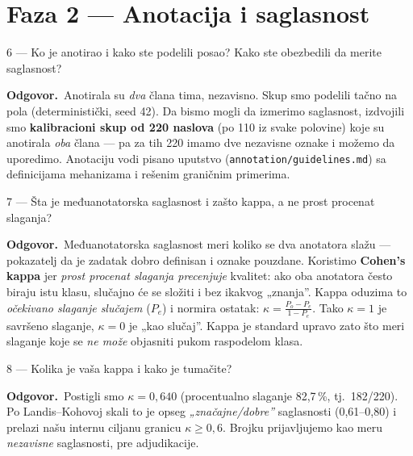 \documentclass[11pt,a4paper]{article}
\newcommand{\kod}[1]{\texttt{#1}}
\newcommand{\odg}{\smallskip\noindent\textbf{Odgovor.}\ }
\begin{document}
\section{Faza 2 --- Anotacija i saglasnost}

\begin{pitanje}{6 --- Ko je anotirao i kako ste podelili posao?}
Kako ste obezbedili da merite saglasnost?
\end{pitanje}
\odg Anotirala su \emph{dva} člana tima, nezavisno. Skup smo podelili tačno na pola
(deterministički, seed 42). Da bismo mogli da izmerimo saglasnost, izdvojili smo
\textbf{kalibracioni skup od 220 naslova} (po 110 iz svake polovine) koje su anotirala
\emph{oba} člana --- pa za tih 220 imamo dve nezavisne oznake i možemo da uporedimo.
Anotaciju vodi pisano uputstvo (\kod{annotation/guidelines.md}) sa definicijama
mehanizama i rešenim graničnim primerima.

\begin{pitanje}{7 --- Šta je međuanotatorska saglasnost i zašto kappa, a ne prost procenat slaganja?}
\end{pitanje}
\odg Međuanotatorska saglasnost meri koliko se dva anotatora slažu --- pokazatelj da
je zadatak dobro definisan i oznake pouzdane. Koristimo \textbf{Cohen's kappa} jer
\emph{prost procenat slaganja precenjuje} kvalitet: ako oba anotatora često biraju istu
klasu, slučajno će se složiti i bez ikakvog „znanja''. Kappa oduzima to \emph{očekivano
slaganje slučajem} ($P_e$) i normira ostatak:
$\kappa=\frac{P_o-P_e}{1-P_e}$. Tako $\kappa=1$ je savršeno slaganje, $\kappa=0$ je „kao
slučaj''. Kappa je standard upravo zato što meri slaganje koje se \emph{ne može}
objasniti pukom raspodelom klasa.

\begin{pitanje}{8 --- Kolika je vaša kappa i kako je tumačite?}
\end{pitanje}
\odg Postigli smo \textbf{$\kappa = 0{,}640$} (procentualno slaganje 82,7\,\%, tj.\
182/220). Po Landis--Kohovoj skali to je opseg \emph{„značajne/dobre''} saglasnosti
(0,61--0,80) i prelazi našu internu ciljanu granicu $\kappa \ge 0{,}6$. Brojku
prijavljujemo kao meru \emph{nezavisne} saglasnosti, pre adjudikacije.
\end{document}
